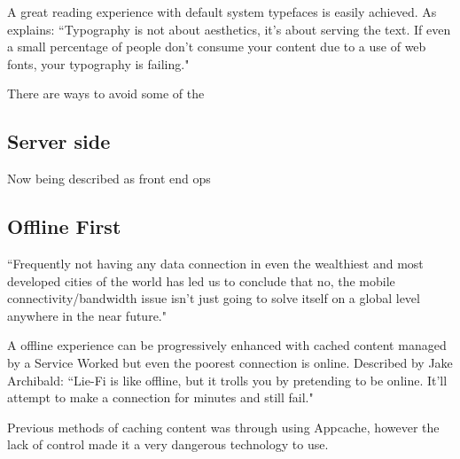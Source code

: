 A great reading experience with default system typefaces is easily achieved. As \cite{against_webfonts} explains: ``Typography is not about aesthetics, it's about serving the text. If even a small percentage of people don't consume your content due to a use of web fonts, your typography is failing."

There are ways to avoid some of the %

\subsection{Server side}

Now being described as front end ops






\subsection{Offline First}

``Frequently not having any data connection in even the wealthiest and most developed cities of the world has led us to conclude that no, the mobile connectivity/bandwidth issue isn’t just going to solve itself on a global level anywhere in the near future." \cite{hello_to_offline_first}


A offline experience can be progressively enhanced with cached content managed by a Service Worked but even the poorest connection is online.
Described by Jake Archibald: ``Lie-Fi is like offline, but it trolls you by pretending to be online. It'll attempt to make a connection for minutes and still fail."

Previous methods of caching content was through using Appcache, however the lack of control made it a very dangerous technology to use. %



